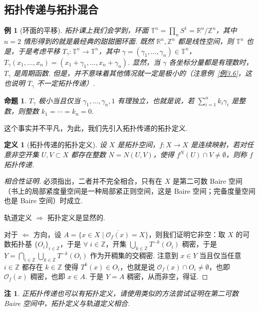 \documentclass[11pt, a4paper, oneside]{ctexart}
\newtheorem{definition}[theorem]{定义}
\newtheorem{example}[theorem]{例}
\newtheorem{proposition}[theorem]{命题}
\newtheorem{remark}[theorem]{注}
\newcommand{\R}{\mathbb{R}}
\newcommand{\T}{\mathbb{T}}
\newcommand{\Z}{\mathbb{Z}}
\newcommand{\cO}{\mathcal{O}}
\begin{document}
    \subsection{拓扑传递与拓扑混合}
    \begin{example}[环面的平移]
        拓扑课上我们会学到，环面 $\T^n=\prod\limits_{n}S^1=\R^n/\Z^n$，其中 $n=2$ 情形得到的就是最经典的甜甜圈环面. 既然 $\R^n,\Z^n$ 都是线性空间，则 $\T^n$ 也是，于是考虑平移 $T_{\gamma}:\T^n\to\T^n$，其中 $\gamma=(\gamma_1,\ldots,\gamma_n)\in\T^n$，$T_{\gamma}(x_1,\ldots,x_n)=(x_1+\gamma_1,\ldots,x_n+\gamma_n)$. 显然，当 $\gamma$ 各坐标分量都是有理数时，$T_{\gamma}$ 是周期函数. 但是，并不意味着其他情况就一定是极小的（注意例~\ref{例3.6}，这也说明 $T_{\gamma}$ 不一定拓扑传递）.
    \end{example}

    \begin{proposition}\label{命题3.9}
        $T_{\gamma}$ 极小当且仅当 $\gamma_1,\ldots,\gamma_n,1$ 有理独立，也就是说，若 $\sum\limits_{i=1}^{n}k_i\gamma_i$ 是整数，则整数 $k_1=\cdots=k_n=0$.
    \end{proposition}

    这个事实并不平凡，为此，我们先引入拓扑传递的拓扑定义.
    \begin{definition}[拓扑传递的拓扑定义]
        设 $X$ 是拓扑空间，$f:X\to X$ 是连续映射，若对任意非空开集 $U,V\subset X$ 都存在整数 $N=N(U,V)$，使得 $f^{N}(U)\cap V\neq\emptyset$，则称 $f$ 拓扑传递.
    \end{definition}
    \begin{proof}[相合性证明]
        必须指出，二者并不完全相合，只有在 $X$ 是第二可数 Baire 空间（书上的局部紧度量空间是一种局部紧正则空间，这是 Baire 空间；完备度量空间也是 Baire 空间）时成立.

        轨道定义 $\Rightarrow$ 拓扑定义是显然的.

        对于 $\Leftarrow$ 方向，设 $A=\{x\in X\mid \overline{\cO_f(x)}=X\}$，则我们证明它非空：取 $X$ 的可数拓扑基 ${\{O_i\}}_{i\in\Z}$，于是 $\forall\; i\in \Z$，开集 $\bigcup\limits_{k\in\Z}T^{-k}(O_i)$ 稠密，于是 $Y=\bigcap\limits_{i\in \Z}\bigcup\limits_{k\in\Z}T^{-k}(O_i)$ 作为开稠集的交稠密. 注意到 $x\in Y$ 当且仅当任意 $i\in\Z$ 都存在 $k\in\Z$ 使得 $T^k(x)\in O_i$，也就是说 $\cO_f(x)\cap O_i\neq\emptyset$，也即 $\cO_f(x)$ 稠密，也即 $x\in A$. 于是 $Y=A$ 稠密，从而非空，得证.
    \end{proof}
    \begin{remark}
        正拓扑传递也可以有拓扑定义，请使用类似的方法尝试证明在第二可数 Baire 空间中，拓扑定义与轨道定义相合.
    \end{remark}
\end{document}
